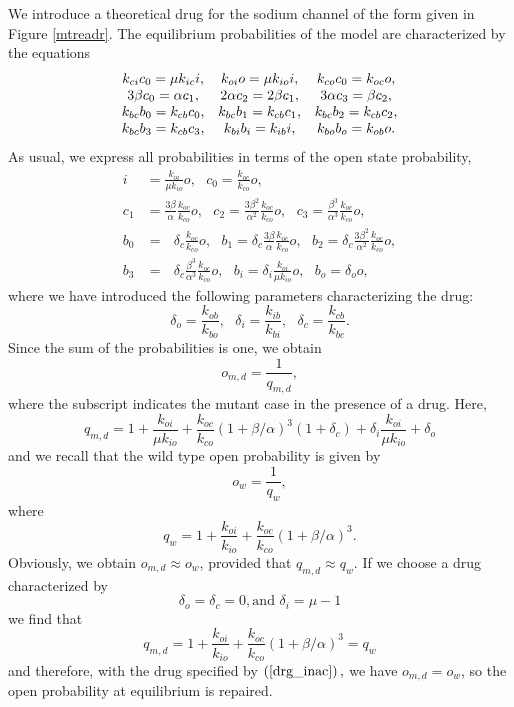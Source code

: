 We introduce a theoretical drug for the sodium channel of the form given in
Figure \ref{mtreadr}. The equilibrium probabilities of the model are characterized by the equations
\[
\begin{array}
[c]{ccc}
k_{ci}c_{0}=\mu k_{ic}i, & k_{oi}o=\mu k_{io}i, & k_{co}c_{0}=k_{oc}o,\\
3\beta c_{0}=\alpha c_{1}, & 2\alpha c_{2}=2\beta c_{1}, & 3\alpha c_{3}=\beta
c_{2},\\
k_{bc}b_{0}=k_{cb}c_{0}, & k_{bc}b_{1}=k_{cb}c_{1}, & k_{bc}b_{2}=k_{cb}c_{2},\\
k_{bc}b_{3}=k_{cb}c_{3}, & k_{bi}b_{i}=k_{ib}i, & k_{bo}b_{o}=k_{ob}o.
\end{array}
\]
As usual, we express all probabilities in terms of the open state probability, \label{9001}
\begin{align*}
i &  =\frac{k_{oi}}{\mu k_{io}}o,\text{ }c_{0}=\frac{k_{oc}}{k_{co}}o,\text{
}\\
c_{1} &  =\frac{3\beta}{\alpha}\frac{k_{oc}}{k_{co}}o,\text{ }c_{2}
=\frac{3\beta^{2}}{\alpha^{2}}\frac{k_{oc}}{k_{co}}o,\text{ }c_{3}=\frac
{\beta^{3}}{\alpha^{3}}\frac{k_{oc}}{k_{co}}o,\\
b_{0} &  =\text{ }\delta_{c}\frac{k_{oc}}{k_{co}}o,\text{ }b_{1}=\text{
}\delta_{c}\frac{3\beta}{\alpha}\frac{k_{oc}}{k_{co}}o,\text{ }b_{2}=\text{
}\delta_{c}\frac{3\beta^{2}}{\alpha^{2}}\frac{k_{oc}}{k_{co}}o,\\
b_{3} &  =\text{ }\delta_{c}\frac{\beta^{3}}{\alpha^{3}}\frac{k_{oc}}{k_{co}
}o,\text{ }b_{i}=\delta_{i}\frac{k_{oi}}{\mu k_{io}}o,\text{ }b_{o}=\delta
_{o}o,
\end{align*}
where we have introduced the following parameters characterizing the drug:
\[
\delta_{o}=\frac{k_{ob}}{k_{bo}},\text{ }\delta_{i}=\frac{k_{ib}}{k_{bi}
},\text{ }\delta_{c}=\frac{k_{cb}}{k_{bc}}.
\]
Since the sum of the probabilities is one, we obtain
\[
o_{m,d}=\frac{1}{q_{m,d}},
\]
where the subscript indicates the mutant case in the presence of a drug. Here,
\[
q_{m,d}=1+\frac{k_{oi}}{\mu k_{io}}+\frac{k_{oc}}{k_{co}}\left(
1+\beta/\alpha\right)  ^{3}\left(  1+\delta_{c}\right)  +\delta_{i}
\frac{k_{oi}}{\mu k_{io}}+\delta_{o}
\]
and we recall that the wild type open probability is given by 
\[
o_{w}=\frac{1}{q_{w}},
\]
where
\[
q_{w}=1+\frac{k_{oi}}{k_{io}}+\frac{k_{oc}}{k_{co}}\left(  1+\beta
/\alpha\right)  ^{3}.
\]
Obviously, we obtain $o_{m,d}\approx o_{w}$, provided that $q_{m,d}\approx q_{w}$.
If we choose a drug characterized by
\begin{equation}
\delta_{o}=\delta_{c}=0,\text{and }\delta_{i}=\mu-1 \label{drg_inac}
\end{equation}
we find that
\[
q_{m,d}=1+\frac{k_{oi}}{k_{io}}+\frac{k_{oc}}{k_{co}}\left(  1+\beta
/\alpha\right)  ^{3}=q_{w}
\]
and therefore, with the drug specified by  $\left(  \ref{drg_inac}\right)
,$ we have $o_{m,d}=o_{w}$, so the open probability at equilibrium is repaired.



